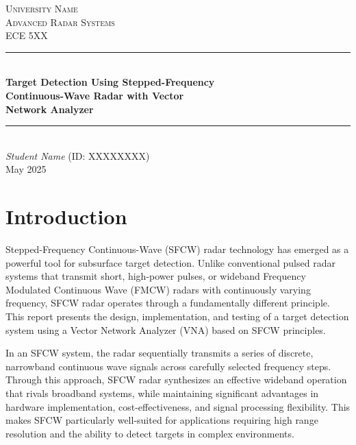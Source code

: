 \documentclass[11pt,a4paper]{article}
\begin{document}
\begin{titlepage}
\newcommand{\HRule}{\rule{\linewidth}{0.5mm}}

\center 
 
\textsc{\LARGE University Name}\\[1cm]

\textsc{\Large Advanced Radar Systems}\\[0.2cm]
\textsc{\large ECE 5XX}\\[1cm] 									

\HRule \\[0.8cm]
{ \huge \bfseries \huge{Target Detection Using Stepped-Frequency\\Continuous-Wave Radar with Vector\\Network Analyzer}}\\[0.7cm]						

\HRule \\[2cm]

\large
\emph{Student Name}
 (ID: XXXXXXXX)\\[1cm]


{\large May 2025}\\[3cm]
\vfill 
\end{titlepage}

\tableofcontents
\newpage

\section{Introduction}
Stepped-Frequency Continuous-Wave (SFCW) radar technology has emerged as a powerful tool for subsurface target detection. Unlike conventional pulsed radar systems that transmit short, high-power pulses, or wideband Frequency Modulated Continuous Wave (FMCW) radars with continuously varying frequency, SFCW radar operates through a fundamentally different principle. This report presents the design, implementation, and testing of a target detection system using a Vector Network Analyzer (VNA) based on SFCW principles.

In an SFCW system, the radar sequentially transmits a series of discrete, narrowband continuous wave signals across carefully selected frequency steps. Through this approach, SFCW radar synthesizes an effective wideband operation that rivals broadband systems, while maintaining significant advantages in hardware implementation, cost-effectiveness, and signal processing flexibility. This makes SFCW particularly well-suited for applications requiring high range resolution and the ability to detect targets in complex environments.
\end{document}
